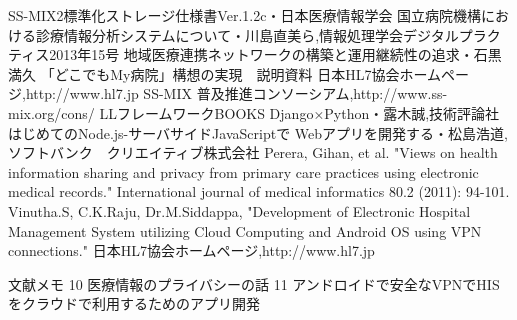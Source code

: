 \documentclass[12pt]{sotsuron}
\begin{document}
\begin{thebibliography}{9}
  SS-MIX2標準化ストレージ仕様書Ver.1.2c・日本医療情報学会
   国立病院機構における診療情報分析システムについて・川島直美ら,情報処理学会デジタルプラクティス2013年15号
   地域医療連携ネットワークの構築と運用継続性の追求・石黒満久
   「どこでもMy病院」構想の実現　説明資料
   日本HL7協会ホームページ,http://www.hl7.jp
   SS-MIX 普及推進コンソーシアム,http://www.ss-mix.org/cons/
   LLフレームワークBOOKS Django×Python・露木誠,技術評論社
   はじめてのNode.js-サーバサイドJavaScriptで Webアプリを開発する・松島浩道,ソフトバンク　クリエイティブ株式会社
   Perera, Gihan, et al. "Views on health information sharing and privacy from primary care practices using electronic medical records." International journal of medical informatics 80.2 (2011): 94-101.
   Vinutha.S, C.K.Raju, Dr.M.Siddappa, "Development of Electronic Hospital Management System utilizing Cloud Computing and Android OS using VPN connections."
   日本HL7協会ホームページ,http://www.hl7.jp

\end{thebibliography}


  文献メモ
  10 医療情報のプライバシーの話
  11 アンドロイドで安全なVPNでHISをクラウドで利用するためのアプリ開発


\clearpage

\listoffigures
\clearpage

\listoftables
\clearpage
\end{document}
